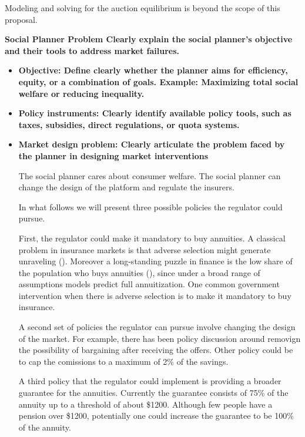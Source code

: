 \documentclass[12pt]{article}
\theoremstyle{plain}
\theoremstyle{plain}
\begin{document}
Modeling and solving for the auction equilibrium is beyond the scope of this proposal. 




\textbf{Social Planner Problem
 Clearly explain the social planner’s objective and their tools to address market
 failures.}

\begin{itemize}
    \item \textbf{Objective: Define clearly whether the planner aims for efficiency, equity, or a combination of goals. Example: Maximizing total social welfare or reducing inequality.}

    \item \textbf{Policy instruments: Clearly identify available policy tools, such as taxes, subsidies, direct regulations, or quota systems.}

    \item \textbf{Market design problem: Clearly articulate the problem faced by the planner in designing market interventions}

    The social planner cares about consumer welfare. The social planner can change the design of the platform and regulate the insurers.   

    In what follows we will present three possible policies the regulator could pursue. 

    First, the regulator could make it mandatory to buy annuities. 
    A classical problem in insurance markets is that adverse selection might generate unraveling (\cite{rothschild_equilibrium_1976}). Moreover a long-standing puzzle in finance is the low share of the population who buys annuities (\cite{modigliani_life_1986}), since under a broad range of assumptions models predict full annuitization. One common government intervention when there is adverse selection is to make it mandatory to buy insurance.  

    A second set of policies the regulator can pursue involve changing the design of the market. For example, there has been policy discussion around removign the possibility of bargaining after receiving the offers. Other policy could be to cap the comissions to a maximum of 2\% of the savings. 

    A third policy that the regulator could implement is providing a broader guarantee for the annuities. Currently the guarantee consists of 75\% of the annuity up to a threshold of about \$1200. Although few people have a pension over  \$1200, potentially one could increase the guarantee to be 100\% of the annuity. 
    
    
\end{itemize}
 
\end{document}
